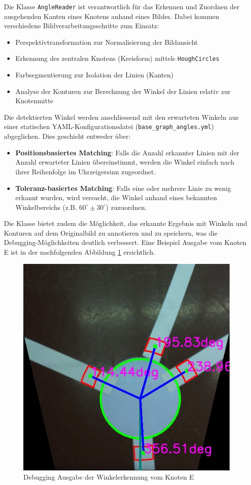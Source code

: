 Die Klasse \verb|AngleReader| ist verantwortlich für das Erkennen und Zuordnen der ausgehenden Kanten eines Knotens anhand eines Bildes. Dabei kommen verschiedene Bildverarbeitungsschritte zum Einsatz: 
\begin{itemize}
    \item Perspektivtransformation zur Normalisierung der Bildansicht
    \item Erkennung des zentralen Knotens (Kreisform) mittels \verb|HoughCircles|
    \item Farbsegmentierung zur Isolation der Linien (Kanten)
    \item Analyse der Konturen zur Berechnung der Winkel der Linien relativ zur Knotenmitte
\end{itemize}

Die detektierten Winkel werden anschliessend mit den erwarteten Winkeln aus einer statischen YAML-Konfigurationsdatei (\verb|base_graph_angles.yml|) abgeglichen. Dies geschieht entweder über:
\begin{itemize}
    \item \textbf{Positionsbasiertes Matching}: Falls die Anzahl erkannter Linien mit der Anzahl erwarteter Linien übereinstimmt, werden die Winkel einfach nach ihrer Reihenfolge im Uhrzeigersinn zugeordnet.
    \item \textbf{Toleranz-basiertes Matching}: Falls eine oder mehrere Linie zu wenig erkannt wurden, wird versucht, die Winkel anhand eines bekannten Winkelbereichs (z.B. $60^\circ \pm 30^\circ$) zuzuordnen.
\end{itemize}

Die Klasse bietet zudem die Möglichkeit, das erkannte Ergebnis mit Winkeln und Konturen auf dem Originalbild zu annotieren und zu speichern, was die Debugging-Möglichkeiten deutlich verbessert. Eine Beispiel Ausgabe vom Knoten E ist in der nachfolgenden Abbildung \ref{fig:angle-reader-debug-output} ersichtlich.

\begin{figure}[H]
    \centering
    \includegraphics[width=0.5\linewidth]{assets/IT/250525_204610_test_annotated_angles_of_E.jpg}
    \caption{Debugging Ausgabe der Winkelerkennung vom Knoten E}
    \label{fig:angle-reader-debug-output}
\end{figure}

